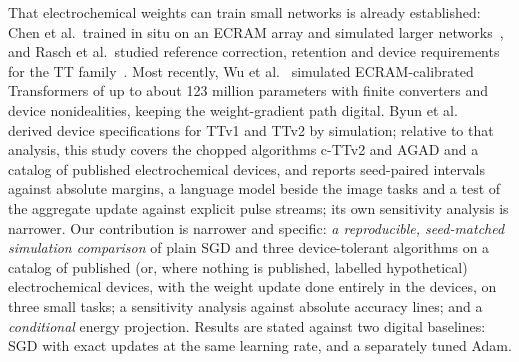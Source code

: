 That electrochemical weights can train small networks is already established: Chen et al.\ trained in situ on an ECRAM array and
simulated larger networks~\cite{chen2023}, and Rasch et al.\ studied reference correction, retention and device requirements for
the TT family~\cite{rasch2024}. Most recently, Wu et al.~\cite{wu2026scale} simulated ECRAM-calibrated Transformers of up to about
123 million parameters with finite converters and device nonidealities, keeping the weight-gradient path digital. Byun et al.~\cite{byun2024} derived device specifications for TTv1 and TTv2 by
simulation; relative to that analysis, this study covers the chopped algorithms c-TTv2 and AGAD and a catalog of published
electrochemical devices, and reports seed-paired intervals against absolute margins, a language model beside the image
tasks and a test of the aggregate update against explicit pulse streams; its own sensitivity analysis is narrower. Our
contribution is narrower and specific: \emph{a reproducible, seed-matched simulation comparison} of plain SGD and three
device-tolerant algorithms on a catalog of published (or, where nothing is published, labelled hypothetical) electrochemical
devices, with the weight update done entirely in the devices, on three small tasks; a sensitivity analysis against absolute
accuracy lines; and a \emph{conditional} energy projection. Results are stated against two digital baselines: SGD with exact
updates at the same learning rate, and a separately tuned Adam.

